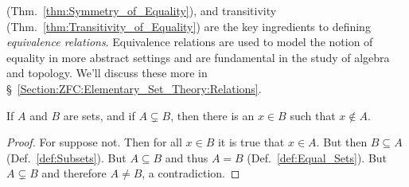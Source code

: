         (Thm.~\ref{thm:Symmetry_of_Equality}), and transitivity
        (Thm.~\ref{thm:Transitivity_of_Equality}) are the key ingredients to
        defining \textit{equivalence relations}.
        Equivalence relations are used to model the notion of equality in more
        abstract settings and are fundamental in the study of algebra and
        topology. We'll discuss these more in
        \S~\ref{Section:ZFC:Elementary_Set_Theory:Relations}.
        \begin{theorem}
            \label{thm:Prop_Subset_Not_Equal}%
            If $A$ and $B$ are sets, and if $A\subsetneq{B}$, then there is an
            $x\in{B}$ such that $x\notin{A}$.
        \end{theorem}
        \begin{proof}
            For suppose not. Then for all $x\in{B}$ it is true that $x\in{A}$.
            But then $B\subseteq{A}$ (Def.~\ref{def:Subsets}).
            But $A\subseteq{B}$ and thus $A=B$ (Def.~\ref{def:Equal_Sets}).
            But $A\subsetneq{B}$ and therefore $A\ne{B}$, a contradiction.
        \end{proof}
